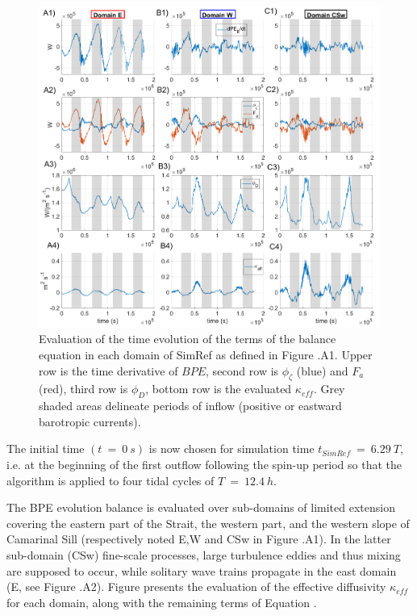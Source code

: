 \begin{figure}[h!]
\centering
\includegraphics[width=1\textwidth]{./CHAP_BPE/Fig_Kappa_CS_colOut.png}
\caption[Evaluation of $\kappa_{eff}$ in different sub-domains of SimRef]{Evaluation of the time evolution of the terms of the balance equation  in each domain of SimRef as defined in Figure .A1. Upper row is the time derivative of $BPE$, second row is $\phi_{\zeta}$ (blue) and $F_a$ (red), third row is $\phi_D$, bottom row is the evaluated $\kappa_{eff}$. Grey shaded areas delineate periods of inflow (positive or eastward barotropic currents).}
\label{figCgbr2d}
\end{figure}
The initial time $(t\ =\ 0\ s)$ is now chosen for simulation time $t_{SimRef}\ =\ 6.29\ T$, i.e. at the beginning of the first outflow following the spin-up period so that the algorithm is applied to four tidal cycles of $T\ =\ 12.4\ h$.

The BPE evolution balance is evaluated over sub-domains of limited extension covering the eastern part of the Strait, the western part, and the western slope of Camarinal Sill (respectively noted E,W and CSw in Figure .A1). In the latter sub-domain (CSw) fine-scale processes, large turbulence eddies and thus mixing are supposed to occur, while solitary wave trains propagate in the east domain (E, see Figure .A2). Figure  presents the evaluation of the effective diffusivity $\kappa_{eff}$ for each domain, along with the remaining terms of Equation .

